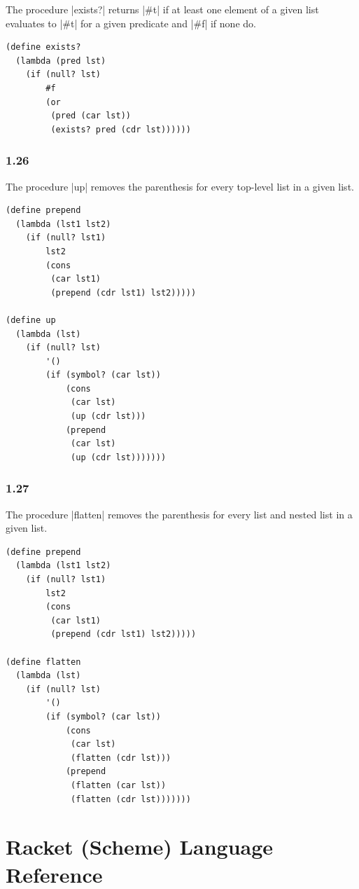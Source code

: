 \documentclass[a4paper]{article}
\begin{document}
The procedure |exists?| returns |#t| if at least one element of a given list evaluates to |#t| for a given predicate and |#f| if none do.

\begin{lstlisting}
(define exists?
  (lambda (pred lst)
    (if (null? lst)
        #f
        (or
         (pred (car lst))
         (exists? pred (cdr lst))))))
\end{lstlisting}

\subsubsection*{1.26}

The procedure |up| removes the parenthesis for every top-level list in a given list.

\begin{lstlisting}
(define prepend
  (lambda (lst1 lst2)
    (if (null? lst1)
        lst2
        (cons
         (car lst1)
         (prepend (cdr lst1) lst2)))))

(define up
  (lambda (lst)
    (if (null? lst)
        '()
        (if (symbol? (car lst))
            (cons
             (car lst)
             (up (cdr lst)))
            (prepend
             (car lst)
             (up (cdr lst)))))))
\end{lstlisting}

\subsubsection*{1.27}

The procedure |flatten| removes the parenthesis for every list and nested list in a given list.

\begin{lstlisting}
(define prepend
  (lambda (lst1 lst2)
    (if (null? lst1)
        lst2
        (cons
         (car lst1)
         (prepend (cdr lst1) lst2)))))

(define flatten
  (lambda (lst)
    (if (null? lst)
        '()
        (if (symbol? (car lst))
            (cons
             (car lst)
             (flatten (cdr lst)))
            (prepend
             (flatten (car lst))
             (flatten (cdr lst)))))))
\end{lstlisting}

\newpage

\section{Racket (Scheme) Language Reference}
\end{document}
